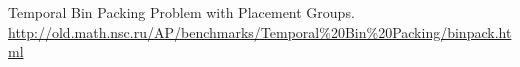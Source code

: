 \documentclass[12pt]{llncs}
\begin{document}
%

\begin{thebibliography}{9} %

Temporal Bin Packing Problem with Placement Groups. \url{http://old.math.nsc.ru/AP/benchmarks/Temporal\%20Bin\%20Packing/binpack.html}


\end{thebibliography}
\hfill \break

\end{document}
